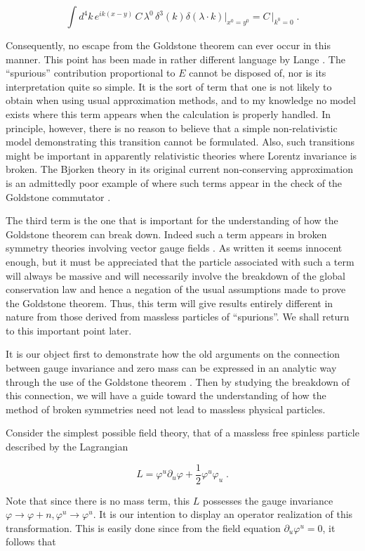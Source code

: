 \documentclass[%
  12pt,
  paper=letter,
  abstracton,
  pagesize=auto,
  version=last,
  DIV=calc
  ]{scrartcl}
\begin{document}
\[
  \int d^4k \,e^{ik(x-y)}\, C\, \lambda^{0}\, \delta^3(k)
  \delta(\lambda\cdot k)\big|_{x^{0}=y^{0}} = C\, \big|_{k^{0}=0}\; .
\]

Consequently, no escape from the Goldstone theorem can ever occur in
this manner.  This point has been made in rather different language by
Lange \cite{7}. The ``spurious'' contribution proportional to $E$ cannot
be disposed of, nor is its interpretation quite so simple.  It is the
sort of term that one is not likely to obtain when using usual
approximation methods, and to my knowledge no model exists where this
term appears when the calculation is properly handled.  In principle,
however, there is no reason to believe that a simple non-relativistic
model demonstrating this transition cannot be formulated.  Also, such
transitions might be important in apparently relativistic theories
where Lorentz invariance is broken.  The Bjorken theory in its
original current non-conserving approximation is an admittedly poor
example of where such terms appear in the check of the Goldstone
commutator \cite{8}.

The third term is the one that is important for the understanding of
how the Goldstone theorem can break down.  Indeed such a term appears
in broken symmetry theories involving vector gauge fields \cite{9}.
As written it seems innocent enough, but it must be appreciated that
the particle associated with such a term will always be massive and
will necessarily involve the breakdown of the global conservation law
and hence a negation of the usual assumptions made to prove the
Goldstone theorem.  Thus, this term will give results entirely
different in nature from those derived from massless particles of
``spurions''.  We shall return to this important point later.

It is our object first to demonstrate how the old arguments on the
connection between gauge invariance and zero mass can be expressed in
an analytic way through the use of the Goldstone theorem \cite{10}.
Then by studying the breakdown of this connection, we will have a guide
toward the understanding of how the method of broken symmetries need
not lead to massless physical particles.

Consider the simplest possible field theory, that of a massless free
spinless particle described by the Lagrangian

\[
  L=\varphi^u \partial_u \varphi + \frac{1}{2} \varphi^u \varphi_u \; .
\]

Note that since there is no mass term, this $L$ possesses the gauge
invariance $\varphi \rightarrow \varphi+n, \varphi^u \rightarrow
\varphi^u$. It is our intention to display an operator realization of
this transformation.  This is easily done since from the field
equation $\partial_u \varphi^u=0$, it follows that
\end{document}
